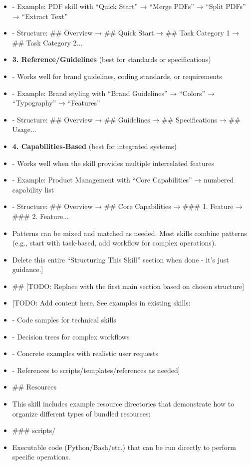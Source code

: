 \documentclass[11pt]{article}
\begin{document}
\begin{itemize}[leftmargin=*,itemsep=2pt,topsep=2pt]
\item {} - Example: PDF skill with ``Quick Start'' → ``Merge PDFs'' → ``Split PDFs'' → ``Extract Text''
\item {} - Structure: \#\# Overview → \#\# Quick Start → \#\# Task Category 1 → \#\# Task Category 2...
\item {} \textbf{3. Reference/Guidelines} (best for standards or specifications)
\item {} - Works well for brand guidelines, coding standards, or requirements
\item {} - Example: Brand styling with ``Brand Guidelines'' → ``Colors'' → ``Typography'' → ``Features''
\item {} - Structure: \#\# Overview → \#\# Guidelines → \#\# Specifications → \#\# Usage...
\item {} \textbf{4. Capabilities-Based} (best for integrated systems)
\item {} - Works well when the skill provides multiple interrelated features
\item {} - Example: Product Management with ``Core Capabilities'' → numbered capability list
\item {} - Structure: \#\# Overview → \#\# Core Capabilities → \#\#\# 1. Feature → \#\#\# 2. Feature...
\item {} Patterns can be mixed and matched as needed. Most skills combine patterns (e.g., start with task-based, add workflow for complex operations).
\item {} Delete this entire ``Structuring This Skill'' section when done - it's just guidance.]
\item {} \#\# [TODO: Replace with the first main section based on chosen structure]
\item {} [TODO: Add content here. See examples in existing skills:
\item {} - Code samples for technical skills
\item {} - Decision trees for complex workflows
\item {} - Concrete examples with realistic user requests
\item {} - References to scripts/templates/references as needed]
\item {} \#\# Resources
\item {} This skill includes example resource directories that demonstrate how to organize different types of bundled resources:
\item {} \#\#\# scripts/
\item {} Executable code (Python/Bash/etc.) that can be run directly to perform specific operations.

\end{itemize}
\end{document}
